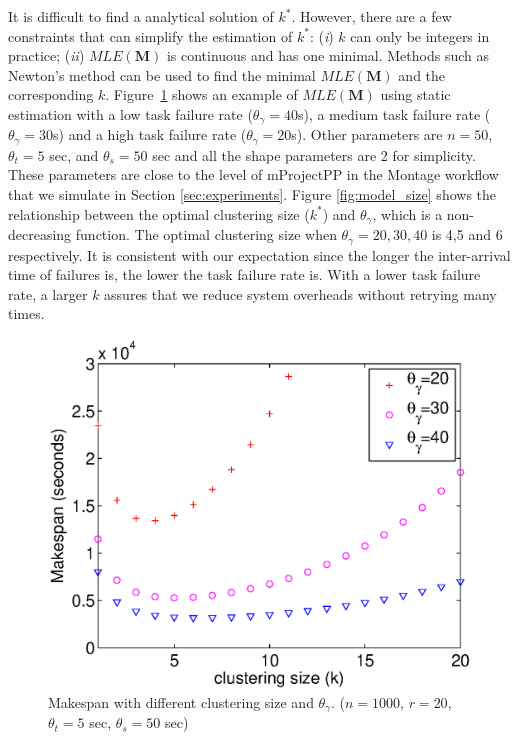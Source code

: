 \documentclass{IOS-Book-Article}
\begin{document}
It is difficult to find a analytical solution of $k^*$. However, there are a few constraints that can simplify the estimation of $k^*$: (\emph{i}) $k$ can only be integers in practice; (\emph{ii}) $MLE(\bm{M})$ is continuous and has one minimal. Methods such as Newton's method can be used to find the minimal $MLE(\bm{M})$ and the corresponding $k$. Figure~\ref{fig:model_makespan} shows an example of $MLE(\bm{M})$ using static estimation with a low task failure rate ($\theta_{\gamma}=40$s), a medium task failure rate ($\theta_{\gamma}=30$s) and a high task failure rate ($\theta_{\gamma}=20$s). Other parameters are $n=50$, $\theta_{t}=5$ sec, and $\theta_{s}=50$ sec and all the shape parameters are 2 for simplicity. These parameters are close to the level of mProjectPP in the Montage workflow that we simulate in Section \ref{sec:experiments}. 
Figure \ref{fig:model_size} shows the relationship between the optimal clustering size ($k^*$) and $\theta_{\gamma}$, which is a non-decreasing function. The optimal clustering size when $\theta_{\gamma}=20,30,40$ is 4,5 and 6 respectively. 
 It is consistent with our expectation since the longer the inter-arrival time of failures is, the lower the task failure rate is. With a lower task failure rate, a larger $k$ assures that we reduce system overheads without retrying many times.  



\begin{figure}[!htb]
\centering
  \includegraphics[width=0.75\linewidth]{model_makespan.eps}
  \caption{Makespan with different clustering size and $\theta_{\gamma}$. ($n=1000$, $r=20$, $\theta_t=5$ sec, $\theta_s=50$ sec)}
  \label{fig:model_makespan}
\end{figure}
\end{document}
